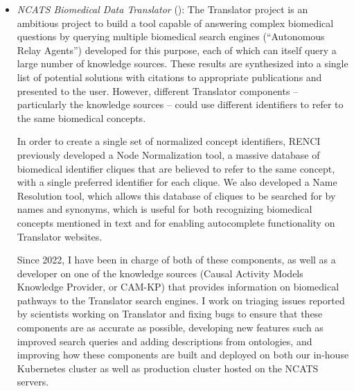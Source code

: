\begin{itemize}

\item \textit{NCATS Biomedical Data Translator} (): The Translator project is an ambitious project to build a tool capable of answering complex biomedical questions by querying multiple biomedical search engines (``Autonomous Relay Agents'') developed for this purpose, each of which can itself query a large number of knowledge sources. These results are synthesized into a single list of potential solutions with citations to appropriate publications and presented to the user. However, different Translator components -- particularly the knowledge sources -- could use different identifiers to refer to the same biomedical concepts.

In order to create a single set of normalized concept identifiers, RENCI previously developed a Node Normalization tool, a massive database of biomedical identifier cliques that are believed to refer to the same concept, with a single preferred identifier for each clique. We also developed a Name Resolution tool, which allows this database of cliques to be searched for by names and synonyms, which is useful for both recognizing biomedical concepts mentioned in text and for enabling autocomplete functionality on Translator websites.

Since 2022, I have been in charge of both of these components, as well as a developer on one of the knowledge sources (Causal Activity Models Knowledge Provider, or CAM-KP) that provides information on biomedical pathways to the Translator search engines. I work on triaging issues reported by scientists working on Translator and fixing bugs to ensure that these components are as accurate as possible, developing new features such as improved search queries and adding descriptions from ontologies, and improving how these components are built and deployed on both our in-house Kubernetes cluster as well as production cluster hosted on the NCATS servers.

\begin{products}




\end{products}
\end{itemize}
